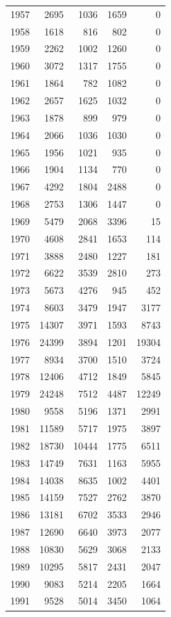 \documentclass[
]{scrartcl}
\begin{document}
\begin{longtable}[]{@{}rrrrr@{}}
1957 & 2695 & 1036 & 1659 & 0 \\
1958 & 1618 & 816 & 802 & 0 \\
1959 & 2262 & 1002 & 1260 & 0 \\
1960 & 3072 & 1317 & 1755 & 0 \\
1961 & 1864 & 782 & 1082 & 0 \\
1962 & 2657 & 1625 & 1032 & 0 \\
1963 & 1878 & 899 & 979 & 0 \\
1964 & 2066 & 1036 & 1030 & 0 \\
1965 & 1956 & 1021 & 935 & 0 \\
1966 & 1904 & 1134 & 770 & 0 \\
1967 & 4292 & 1804 & 2488 & 0 \\
1968 & 2753 & 1306 & 1447 & 0 \\
1969 & 5479 & 2068 & 3396 & 15 \\
1970 & 4608 & 2841 & 1653 & 114 \\
1971 & 3888 & 2480 & 1227 & 181 \\
1972 & 6622 & 3539 & 2810 & 273 \\
1973 & 5673 & 4276 & 945 & 452 \\
1974 & 8603 & 3479 & 1947 & 3177 \\
1975 & 14307 & 3971 & 1593 & 8743 \\
1976 & 24399 & 3894 & 1201 & 19304 \\
1977 & 8934 & 3700 & 1510 & 3724 \\
1978 & 12406 & 4712 & 1849 & 5845 \\
1979 & 24248 & 7512 & 4487 & 12249 \\
1980 & 9558 & 5196 & 1371 & 2991 \\
1981 & 11589 & 5717 & 1975 & 3897 \\
1982 & 18730 & 10444 & 1775 & 6511 \\
1983 & 14749 & 7631 & 1163 & 5955 \\
1984 & 14038 & 8635 & 1002 & 4401 \\
1985 & 14159 & 7527 & 2762 & 3870 \\
1986 & 13181 & 6702 & 3533 & 2946 \\
1987 & 12690 & 6640 & 3973 & 2077 \\
1988 & 10830 & 5629 & 3068 & 2133 \\
1989 & 10295 & 5817 & 2431 & 2047 \\
1990 & 9083 & 5214 & 2205 & 1664 \\
1991 & 9528 & 5014 & 3450 & 1064 \\

\end{longtable}
\end{document}

